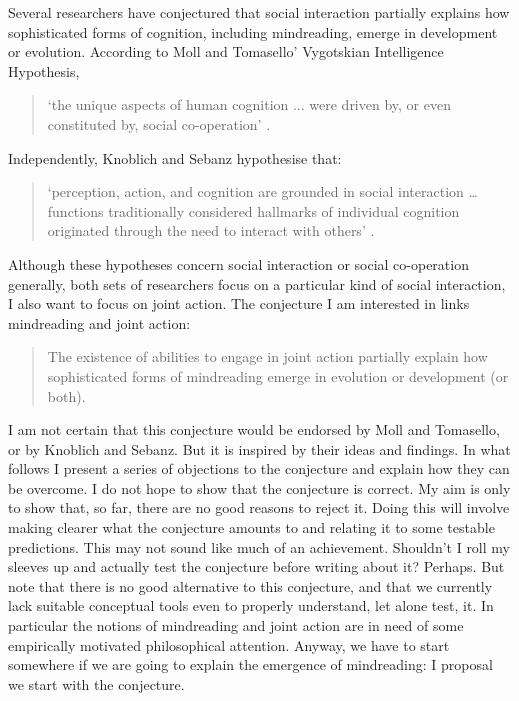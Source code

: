\documentclass[12pt,\papersize]{extarticle}
\begin{document}
Several researchers have conjectured that social interaction partially explains how sophisticated forms of cognition, including mindreading, emerge in development or evolution.
According to Moll and Tomasello' Vygotskian Intelligence Hypothesis, 
%
\begin{quote} 
`the unique aspects of human cognition ... were driven by, or even constituted by, social co-operation'
\citep[p.\ 1]{Moll:2007gu}.
\end{quote}
%
Independently, Knoblich and Sebanz hypothesise that: 
\begin{quote} 
`perception, action, and cognition are grounded in social interaction
 … functions traditionally considered hallmarks of individual cognition originated through the need to interact with others' \citep[p.\ 103]{Knoblich:2006bn}.
\end{quote}
%
Although these hypotheses concern social interaction or social co-operation generally, both sets of researchers focus on a particular kind of social interaction, 
I also want to focus on joint action.
The conjecture I am interested in links mindreading and joint action:
%
\begin{quote}
The existence of abilities to engage in joint action partially explain how sophisticated forms of mindreading emerge in evolution or development (or both).%
\end{quote}
%
I am not certain that this conjecture would be endorsed by Moll and Tomasello, or by Knoblich and Sebanz.
But it is inspired by their ideas and findings.
In what follows I present a series of objections to the conjecture and explain how they can be overcome.
I do not hope to show that the conjecture is correct. 
My aim is only to show that, so far, there are no good reasons to reject it.
Doing this will involve making clearer what the conjecture amounts to and relating it to some testable predictions.  
This may not sound like much of an achievement. 
Shouldn't I roll my sleeves up and actually test the conjecture before writing about it? 
Perhaps.
But note that there is no good alternative to this conjecture, and that we currently lack suitable conceptual tools even to properly understand, let alone test, it. 
In particular the notions of mindreading and joint action are  in need of some empirically motivated philosophical attention.
Anyway, we have to start somewhere if we are going to explain the emergence of mindreading: I proposal we start with the conjecture.
\end{document}
